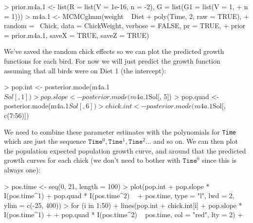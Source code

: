 \documentclass{article}
\begin{document}
\begin{Schunk}
\begin{Sinput}
> prior.m4a.1 <- list(R = list(V = 1e-16, n = -2), G = list(G1 = list(V = 1, 
+     n = 1)))
> m4a.1 <- MCMCglmm(weight ~ Diet + poly(Time, 2, raw = TRUE), 
+     random = ~Chick, data = ChickWeight, verbose = FALSE, pr = TRUE, 
+     prior = prior.m4a.1, saveX = TRUE, saveZ = TRUE)
\end{Sinput}
\end{Schunk}

We've saved the random chick effects so we can plot the predicted growth functions for each bird. For now we will just predict the growth function assuming that all birds were on Diet 1 (the intercept): 

\begin{Schunk}
\begin{Sinput}
> pop.int <- posterior.mode(m4a.1$Sol[, 1])
> pop.slope <- posterior.mode(m4a.1$Sol[, 5])
> pop.quad <- posterior.mode(m4a.1$Sol[, 6])
> chick.int <- posterior.mode(m4a.1$Sol[, c(7:56)])
\end{Sinput}
\end{Schunk}

We need to combine these parameter estimates with the polynomials for \texttt{Time} which are just the sequence $\texttt{Time}^{0}, \texttt{Time}^1, \texttt{Time}^2 \dots$ and so on. We can then plot the population expected population growth curve, and around that the predicted growth curves for each chick (we don't need to bother with $\texttt{Time}^{0}$ since this is always one):

\iftalk
\else

\begin{Schunk}
\begin{Sinput}
> pos.time <- seq(0, 21, length = 100)
> plot(pop.int + pop.slope * I(pos.time^1) + pop.quad * I(pos.time^2) ~ 
+     pos.time, type = "l", lwd = 2, ylim = c(-25, 400))
> for (i in 1:50) {
+     lines(pop.int + chick.int[i] + pop.slope * I(pos.time^1) + 
+         pop.quad * I(pos.time^2) ~ pos.time, col = "red", lty = 2)
+ }
\end{Sinput}
\end{Schunk}
\fi
\end{document}
